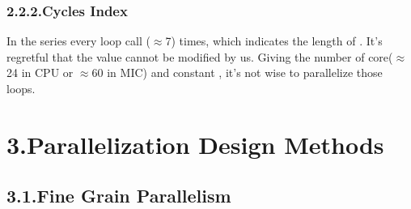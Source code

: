 \documentclass{article}
\begin{document}
\subsubsection{2.2.2.\hspace*{0.5em}Cycles Index}\label{sec-cycles-index}%

\noindent{}In the  series every loop call  (\ensuremath{\approx}7) times, which indicates the length of . It's regretful that the value cannot be modified by us. Giving the number of core(\ensuremath{\approx}24 in CPU or \ensuremath{\approx}60 in MIC) and constant , it's not wise to parallelize those loops.%

\section{3.\hspace*{0.5em}Parallelization Design Methods}\label{sec-parallelization-design-methods}%

\subsection{3.1.\hspace*{0.5em}Fine Grain Parallelism}\label{sec-fine-grain-parallelism}%
\end{document}
